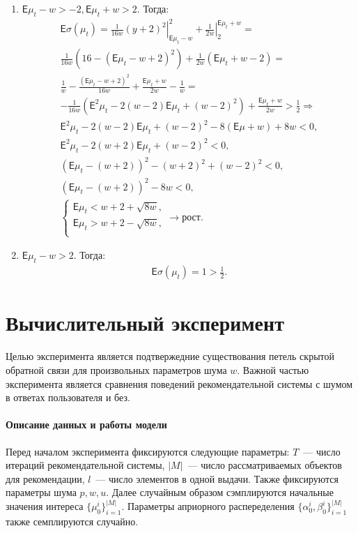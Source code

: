 \documentclass[12pt, twoside]{article}
\begin{document}
\begin{enumerate}
  \item $\mathsf{E}\mu_t - w > -2, \mathsf{E}\mu_t + w > 2$. Тогда: 
    \begin{gather*}
      \mathsf{E}\sigma(\mu_t) = \left. \frac{1}{16 w} (y+2)^2 \right|_{\mathsf{E}\mu_t-w}^{2} + \left. \frac{1}{2w}\right|_{2}^{\mathsf{E}\mu_t + w} = \\ 
          \frac{1}{16 w} \left( 16 - (\mathsf{E} \mu_t-w+2)^2 \right) + \frac{1}{2 w}(\mathsf{E}\mu_t + w -2) = \\
          \frac{1}{w} - \frac{(\mathsf{E}\mu_t-w+2)^2}{16w} + \frac{\mathsf{E}\mu_t+w}{2w} - \frac{1}{w} = \\
          -\frac{1}{16w} (\mathsf{E}^2\mu_t - 2(w-2)\mathsf{E}\mu_t + (w-2)^2) + \frac{\mathsf{E}\mu_t + w}{2 w} > \frac{1}{2} \Rightarrow \\
          \mathsf{E}^2\mu_t - 2(w-2)\mathsf{E}\mu_t + (w-2)^2 - 8(\mathsf{E}\mu + w) + 8w < 0, \\
          \mathsf{E}^2\mu_t - 2(w+2)\mathsf{E}\mu_t + (w-2)^2 < 0, \\
          \left(\mathsf{E}\mu_t - (w+2) \right)^2 - (w+2)^2 + (w-2)^2 < 0, \\
          (\mathsf{E}\mu_t - (w+2))^2 - 8w < 0, \\
    \begin{cases}
      \mathsf{E}\mu_t < w + 2 + \sqrt{8w}, \\
      \mathsf{E}\mu_t > w + 2 - \sqrt{8w}, \\
    \end{cases} \to \text{рост}.
    \end{gather*}
  
  \item $\mathsf{E}\mu_t - w > 2$. Тогда: 
    \begin{gather*}
      \mathsf{E}\sigma(\mu_t) = 1 > \frac{1}{2}.
    \end{gather*}
\end{enumerate}
 
\section{Вычислительный эксперимент }
Целью эксперимента является подтвержедние существования петель скрытой обратной связи для произвольных параметров шума $w$. 
Важной частью эксперимента является сравнения поведений рекомендательной системы с шумом в ответах пользователя и без. 

\paragraph{Описание данных и работы модели}
Перед началом эксперимента фиксируются следующие параметры: $T$~--- число итераций рекомендательной системы, $|M|$~--- число рассматриваемых объектов для рекомендации, $l$~--- число элементов в одной выдачи. 
Также фиксируются параметры шума $p, w, u$.
Далее случайным образом сэмплируются начальные значения интереса $\{\mu_0^i\}_{i=1}^{|M|}$. 
Параметры априорного распеределения $\{\alpha_0^i, \beta_0^i\}_{i=1}^{|M|}$  также семплируются случайно.
\end{document}
